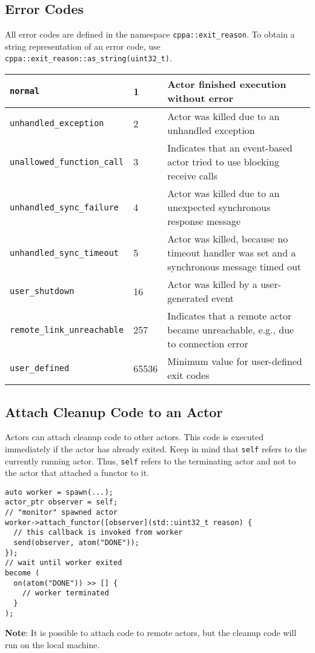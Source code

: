 \subsection{Error Codes}

All error codes are defined in the namespace \lstinline^cppa::exit_reason^.
To obtain a string representation of an error code, use \lstinline^cppa::exit_reason::as_string(uint32_t)^.

\begin{tabular*}{\textwidth}{m{}m{}m{}}
  \hline
  \lstinline^normal^ & 1 & Actor finished execution without error \\
  \hline
  \lstinline^unhandled_exception^ & 2 & Actor was killed due to an unhandled exception \\
  \hline
  \lstinline^unallowed_function_call^ & 3 & Indicates that an event-based actor tried to use blocking receive calls \\
  \hline
  \lstinline^unhandled_sync_failure^ & 4 & Actor was killed due to an unexpected synchronous response message \\
  \hline
  \lstinline^unhandled_sync_timeout^ & 5 & Actor was killed, because no timeout handler was set and a synchronous message timed out \\
  \hline
  \lstinline^user_shutdown^ & 16 & Actor was killed by a user-generated event \\
  \hline
  \lstinline^remote_link_unreachable^ & 257 & Indicates that a remote actor became unreachable, e.g., due to connection error \\
  \hline
  \lstinline^user_defined^ & 65536 & Minimum value for user-defined exit codes \\
  \hline
\end{tabular*}

\subsection{Attach Cleanup Code to an Actor}

Actors can attach cleanup code to other actors.
This code is executed immediately if the actor has already exited.
Keep in mind that \lstinline^self^ refers to the currently running actor.
Thus, \lstinline^self^ refers to the terminating actor and not to the actor that attached a functor to it.

\begin{lstlisting}
auto worker = spawn(...);
actor_ptr observer = self;
// "monitor" spawned actor
worker->attach_functor([observer](std::uint32_t reason) {
  // this callback is invoked from worker
  send(observer, atom("DONE"));
});
// wait until worker exited
become (
  on(atom("DONE")) >> [] {
    // worker terminated
  }
);
\end{lstlisting}

\textbf{Note}: It is possible to attach code to remote actors, but the cleanup code will run on the local machine.
